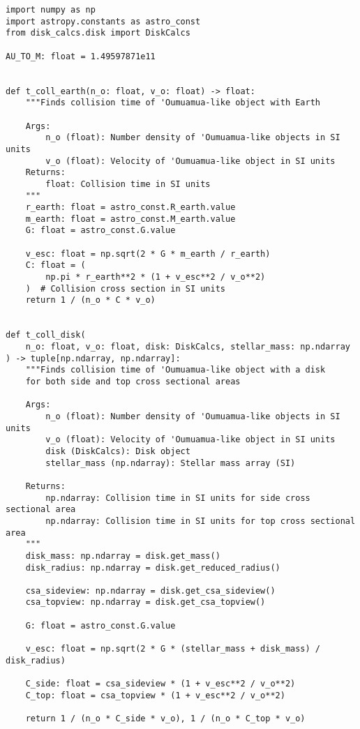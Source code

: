 \begin{lstlisting}
import numpy as np
import astropy.constants as astro_const
from disk_calcs.disk import DiskCalcs

AU_TO_M: float = 1.49597871e11


def t_coll_earth(n_o: float, v_o: float) -> float:
    """Finds collision time of 'Oumuamua-like object with Earth

    Args:
        n_o (float): Number density of 'Oumuamua-like objects in SI units
        v_o (float): Velocity of 'Oumuamua-like object in SI units
    Returns:
        float: Collision time in SI units
    """
    r_earth: float = astro_const.R_earth.value
    m_earth: float = astro_const.M_earth.value
    G: float = astro_const.G.value

    v_esc: float = np.sqrt(2 * G * m_earth / r_earth)
    C: float = (
        np.pi * r_earth**2 * (1 + v_esc**2 / v_o**2)
    )  # Collision cross section in SI units
    return 1 / (n_o * C * v_o)


def t_coll_disk(
    n_o: float, v_o: float, disk: DiskCalcs, stellar_mass: np.ndarray
) -> tuple[np.ndarray, np.ndarray]:
    """Finds collision time of 'Oumuamua-like object with a disk
    for both side and top cross sectional areas

    Args:
        n_o (float): Number density of 'Oumuamua-like objects in SI units
        v_o (float): Velocity of 'Oumuamua-like object in SI units
        disk (DiskCalcs): Disk object
        stellar_mass (np.ndarray): Stellar mass array (SI)

    Returns:
        np.ndarray: Collision time in SI units for side cross sectional area
        np.ndarray: Collision time in SI units for top cross sectional area
    """
    disk_mass: np.ndarray = disk.get_mass()
    disk_radius: np.ndarray = disk.get_reduced_radius()

    csa_sideview: np.ndarray = disk.get_csa_sideview()
    csa_topview: np.ndarray = disk.get_csa_topview()

    G: float = astro_const.G.value

    v_esc: float = np.sqrt(2 * G * (stellar_mass + disk_mass) / disk_radius)

    C_side: float = csa_sideview * (1 + v_esc**2 / v_o**2)
    C_top: float = csa_topview * (1 + v_esc**2 / v_o**2)

    return 1 / (n_o * C_side * v_o), 1 / (n_o * C_top * v_o)
\end{lstlisting}